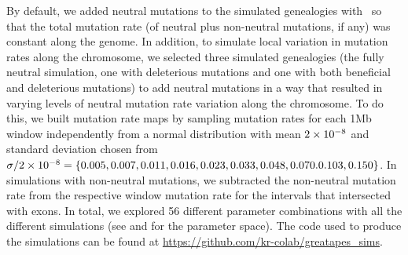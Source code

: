 By default, we added neutral mutations to the simulated genealogies with \msprime ~so that the total mutation rate
(of neutral plus non-neutral mutations, if any) was constant along the genome.
In addition, to simulate local variation in mutation rates along the chromosome, 
we selected three simulated genealogies (the fully neutral simulation, one with deleterious mutations and one with both beneficial and deleterious mutations)
to add neutral mutations in a way that resulted in varying levels of neutral mutation rate variation along the chromosome.
To do this, we built mutation rate maps by sampling mutation rates for each 1Mb window independently from a normal distribution with mean ${2}\times10^{-8}$
and standard deviation chosen from $\sigma / {2}\times10^{-8} = \{ 0.005, 0.007, 0.011, 0.016, 0.023, 0.033,\allowbreak 0.048, 0.070. 0.103, 0.150 \}$.
In simulations with non-neutral mutations, we subtracted the non-neutral mutation rate from the respective window mutation rate for the intervals that intersected with exons.
In total, we explored 56 different parameter combinations with all the different simulations (see  and  for the parameter space).
The code used to produce the simulations can be found at \url{https://github.com/kr-colab/greatapes_sims}.

